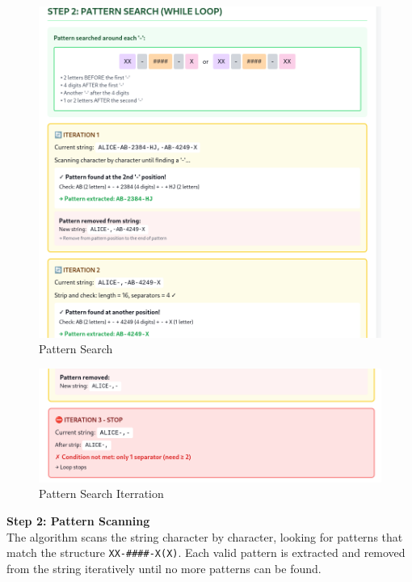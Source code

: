 \documentclass[12pt,a4paper]{article}
\begin{document}
\begin{figure}[H]
    \centering
    \includegraphics[width=\linewidth]{AIMS_Senegal__Assignment_template/step2Parsing.png}
    \caption{Pattern Search}
    \label{fig:step1Parsing}
\end{figure}

\begin{figure}[H]
    \centering
    \includegraphics[width=\linewidth]{step2-1parsing.png}
    \caption{Pattern Search Iterration}
    \label{fig:step1Parsing}
\end{figure}


\textbf{Step 2: Pattern Scanning} \\
The algorithm scans the string character by character, looking for patterns that match the structure \texttt{XX-####-X(X)}. Each valid pattern is extracted and removed from the string iteratively until no more patterns can be found.
\end{document}
